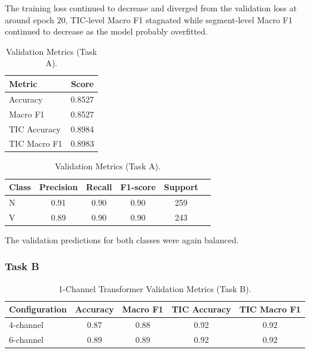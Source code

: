 \FloatBarrier

The training loss continued to decrease and diverged from the validation loss at around epoch $20$, TIC-level Macro F1 stagnated while segment-level Macro F1 continued to decrease as the model probably overfitted.

\begin{table}[H]
    \centering
    \footnotesize
    \renewcommand{\arraystretch}{1.1}

    \begin{minipage}[t]{0.32\textwidth}
        \centering
        \begin{tabularx}{\textwidth}{X c}
            \toprule
            \textbf{Metric} & \textbf{Score} \tabularnewline
            \midrule
            Accuracy    &  0.8527 \tabularnewline
            Macro F1    & 0.8527 \tabularnewline
            TIC Accuracy & 0.8984 \tabularnewline
            TIC Macro F1 & 0.8983 \tabularnewline
            \bottomrule
        \end{tabularx}
    \end{minipage}
    \hfill
    \begin{minipage}[t]{0.64\textwidth}
        \centering
        \footnotesize
        \begin{tabularx}{\textwidth}{X c c c c c}
            \toprule
            \textbf{Class} & \textbf{Precision} & \textbf{Recall} & \textbf{F1-score} & \textbf{Support} \tabularnewline
            \midrule
            N & 0.91 & 0.90 & 0.90 & 259 \tabularnewline
            V & 0.89 & 0.90 & 0.90 & 243   \tabularnewline
            \bottomrule
        \end{tabularx}
    \end{minipage}

    \caption[Phase 2 -- 6-Channel Transformer Validation Metrics (A)]{Validation Metrics (Task A).}
    \label{tab:06_phase_2_6_channel_transformer_validation_,etrics_a}
\end{table}

\FloatBarrier

The validation predictions for both classes were again balanced.

\subsubsection{Task B}

\begin{table}[H]
    \centering
    \small
    \renewcommand{\arraystretch}{1.1}
    \begin{tabularx}{\textwidth}{X c c c c}
        \toprule
        \textbf{Configuration} & \textbf{Accuracy} & \textbf{Macro F1} & \textbf{TIC Accuracy} & \textbf{TIC Macro F1}  \tabularnewline
        \midrule
        4-channel & 0.87 & 0.88 & 0.92 & 0.92 \tabularnewline
        6-channel & 0.89 & 0.89 & 0.92 & 0.92 \tabularnewline
        \bottomrule
    \end{tabularx}
    \caption[Phase 2 -- 1-Channel Transformer Metrics (B)]{1-Channel Transformer Validation Metrics (Task B).}
    \label{tab:06_phase_2_1_channel_bx}
\end{table}

